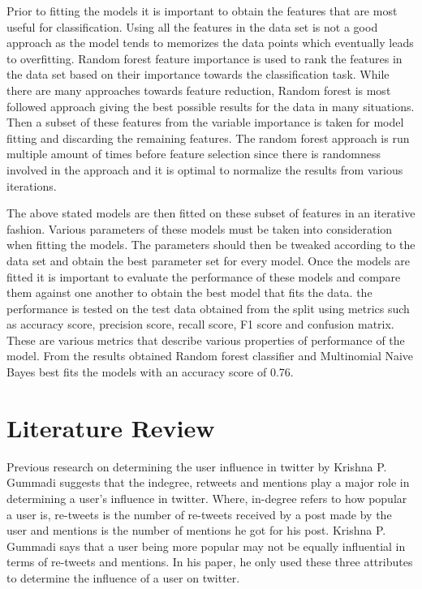 \documentclass[sigconf]{acmart}
\begin{document}
Prior to fitting the models it is important to obtain the features that are most useful for classification. Using all the features in the data set is not a good approach as the model tends to  memorizes the data points which eventually leads to overfitting. Random forest feature importance is used to rank the features in the data set based on their importance towards the classification task. While there are many approaches towards feature reduction, Random forest is most followed approach giving the best possible results for the data in many situations. Then a subset of these features from the variable importance is taken for model fitting and discarding the remaining features. The random forest approach is run multiple amount of times before feature selection since there is randomness involved in the approach and it is optimal to normalize the results from various iterations.

The above stated models are then fitted on these subset of features in an iterative fashion. Various parameters of these models must be taken into consideration when fitting the models. The parameters should then be tweaked according to the data set and obtain the best parameter set for every model. Once the models are fitted it is important to evaluate the performance of these models and compare them against one another to obtain the best model that fits the data. the performance is tested on the test data obtained from the split using metrics such as accuracy score, precision score, recall score, F1 score and confusion matrix. These are various metrics that describe various properties of performance of the model. From the results obtained Random forest classifier and Multinomial Naive Bayes best fits the models with an accuracy score of 0.76.
\section{Literature Review}

Previous research on determining the user influence in twitter by Krishna P. Gummadi suggests that the indegree, retweets and mentions play a major role in determining a user’s influence in twitter. Where, in-degree refers to how popular a user is, re-tweets is the number of re-tweets received by a post made by the user and mentions is the number of mentions he got for his post. Krishna P. Gummadi says that a user being more popular may not be equally influential in terms of re-tweets and mentions. In his paper, he only used these three attributes to determine the influence of a user on twitter.
\end{document}
